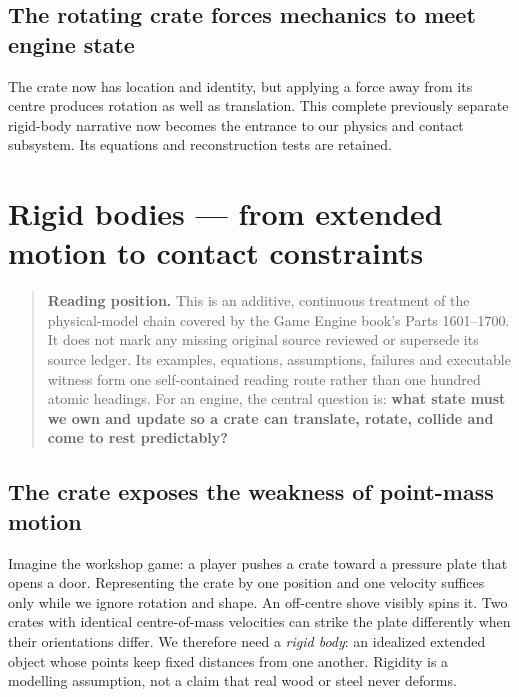\subsection{The rotating crate forces mechanics to meet engine state}\label{the-rotating-crate-forces-mechanics-to-meet-engine-state}

The crate now has location and identity, but applying a force away from its centre produces rotation as well as translation. This complete previously separate rigid-body narrative now becomes the entrance to our physics and contact subsystem. Its equations and reconstruction tests are retained.

\section{Rigid bodies --- from extended motion to contact constraints}\label{rigid-bodies-from-extended-motion-to-contact-constraints}

\begin{quote}
\textbf{Reading position.} This is an additive, continuous treatment of the physical-model chain covered by the Game Engine book's Parts 1601--1700. It does not mark any missing original source reviewed or supersede its source ledger. Its examples, equations, assumptions, failures and executable witness form one self-contained reading route rather than one hundred atomic headings. For an engine, the central question is: \textbf{what state must we own and update so a crate can translate, rotate, collide and come to rest predictably?}
\end{quote}

\subsection{The crate exposes the weakness of point-mass motion}\label{the-crate-exposes-the-weakness-of-point-mass-motion}

Imagine the workshop game: a player pushes a crate toward a pressure plate that opens a door. Representing the crate by one position and one velocity suffices only while we ignore rotation and shape. An off-centre shove visibly spins it. Two crates with identical centre-of-mass velocities can strike the plate differently when their orientations differ. We therefore need a \emph{rigid body}: an idealized extended object whose points keep fixed distances from one another. Rigidity is a modelling assumption, not a claim that real wood or steel never deforms.


